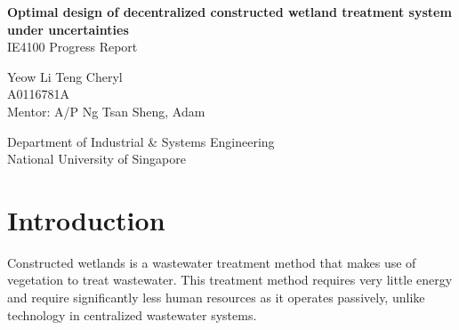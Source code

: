 \documentclass[preprint,12pt,authoryear]{elsarticle}
\begin{document}
\setlength{\abovedisplayskip}{3pt}
\setlength{\belowdisplayskip}{3pt}

\begin{titlepage}
    \begin{center}
        \vspace*{1cm}
        
        \Huge
	 \textbf{Optimal design of decentralized constructed wetland treatment system under uncertainties}\\        
	 \noindent\makebox[\linewidth]{\rule{0.7\paperwidth}{0.4pt}}
        \vspace{0.5cm}
        \LARGE
        IE4100 Progress Report
        
        \vspace{1.5cm}
        
        Yeow Li Teng Cheryl\\
	  A0116781A\\
	  Mentor: A/P Ng Tsan Sheng, Adam
        
        \vfill
        
        \vspace{0.8cm}
        
        
        \Large
        Department of Industrial \& Systems Engineering\\
        National University of Singapore\\
        
    \end{center}
\end{titlepage}

	

	







 
\section{Introduction}
Constructed wetlands is a wastewater treatment method that makes use of vegetation to treat wastewater. This treatment method requires very little energy and require significantly less human resources as it operates passively, unlike technology in centralized wastewater systems.
\end{document}
